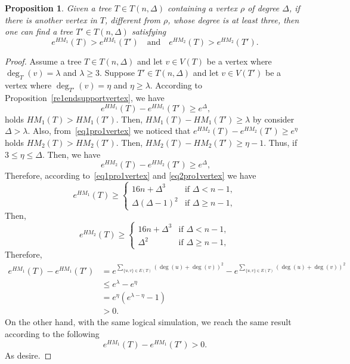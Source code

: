 \documentclass{article}
\newtheorem{proposition}{Proposition}[section]
\theoremstyle{definition}
\begin{document}
\begin{proposition}\label{pro1vertex}
Given a tree $T \in T(n, \Delta)$ containing a vertex $\rho$ of degree $\Delta$, if there is another vertex in $T$, different from $\rho$, whose degree is at least three, then one can find a tree $T' \in T(n, \Delta)$ satisfying
\[
e^{HM_1}(T) > e^{HM_1}(T') \quad \text{and} \quad e^{HM_2}(T) > e^{HM_2}(T').
\]
\end{proposition}
\begin{proof}
Assume a tree $T \in T(n, \Delta)$ and let $v\in V(T)$ be a vertex where $\deg_T(v)=\lambda$ and $\lambda\geqslant 3$. Suppose $T' \in T(n, \Delta)$ and  let $v\in V(T')$ be a vertex where $\deg_{T'}(v)=\eta$ and $\eta\geqslant \lambda$.
According to Proposition~\ref{re1endsupportvertex}, we have 
\begin{equation}~\label{eq1pro1vertex}
e^{HM_1}(T)- e^{HM_1}(T')\geqslant e^{\Delta}, 
\end{equation}
holds $HM_1(T) > HM_1(T')$. Then, $HM_1(T)-HM_1(T')\geqslant \lambda$ by consider $\Delta>\lambda$.  Also, from~\eqref{eq1pro1vertex} we noticed that $e^{HM_2}(T)- e^{HM_2}(T')\geqslant e^{\eta}$ holds $HM_2(T) > HM_2(T')$. Then, $HM_2(T)-HM_2(T')\geqslant \eta-1$. Thus, if $3\leqslant \eta \leqslant \Delta$. Then, we have 
\begin{equation}~\label{eq2pro1vertex}
e^{HM_2}(T)- e^{HM_2}(T')\geqslant e^{\Delta}, 
\end{equation}
Therefore, according to~\eqref{eq1pro1vertex} and \eqref{eq2pro1vertex} we have 
\[
e^{HM_1}(T) \geq
\begin{cases}
16 n + \Delta^{3}  & \text{if } \Delta < n-1, \\
\Delta (\Delta - 1)^2 & \text{if } \Delta \geqslant n-1,
\end{cases}
\]
Then, 
\[
e^{HM_2}(T) \geq
\begin{cases}
16 n + \Delta^{3} & \text{if } \Delta < n-1, \\
\Delta^{2} & \text{if } \Delta \geqslant n-1,
\end{cases}
\]
Therefore,
\begin{align*}
e^{HM_1}(T)- e^{HM_1}(T') &= e^{\sum_{\{u,v\} \in E(T)} \left( \deg(u) + \deg(v) \right)^2}-e^{\sum_{\{u,v\} \in E(T)} \left( \deg(u) + \deg(v) \right)^2}\\
&\leqslant e^{\lambda}-e^{\eta}\\
&=e^{\eta}(e^{\lambda-\eta}-1)\\
&>0.
\end{align*}
On the other hand, with the same logical simulation, we reach the same result according to the following
\[
e^{HM_1}(T)- e^{HM_1}(T')>0.
\]
As desire.
\end{proof}
\end{document}
